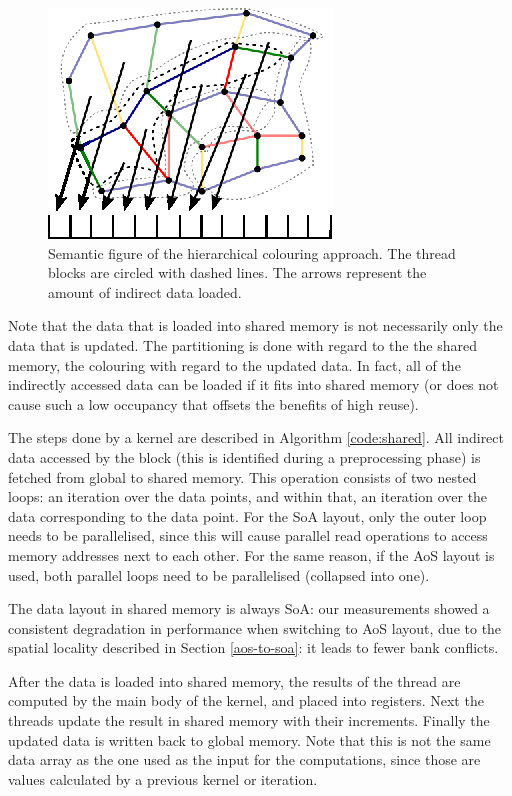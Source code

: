 \begin{figure}[Htpb]
  \centering
  \includegraphics{fig/svg/unstructured_hier.eps}
  \caption{Semantic figure of the hierarchical colouring approach. The thread
  blocks are circled with dashed lines. The arrows represent the amount of
  indirect data loaded.}
  \label{fig:unstructured_hier}
\end{figure}

Note that the data that is loaded into shared memory is not necessarily only the
data that is updated. The partitioning is done with regard to the the shared
memory, the colouring with regard to the updated data. In fact, all of the
indirectly accessed data can be loaded if it fits into shared memory (or does
not cause such a low occupancy that offsets the benefits of high reuse).

The steps done by a kernel are described in Algorithm \ref{code:shared}. All
indirect data accessed by the block (this is identified during a preprocessing
phase) is fetched from global to shared memory. This operation consists of two
nested loops: an iteration over the data points, and within that, an iteration
over the data corresponding to the data point. For the SoA layout, only the
outer loop needs to be parallelised, since this will cause parallel read
operations to access memory addresses next to each other. For the same reason,
if the AoS layout is used, both parallel loops need to be parallelised
(collapsed into one).

The data layout in shared memory is always SoA: our measurements showed a
consistent degradation in performance when switching to AoS layout, due to the
spatial locality described in Section \ref{aos-to-soa}: it leads to fewer bank
conflicts.

After the data is loaded into shared memory, the results of the thread are
computed by the main body of the kernel, and placed into registers.  Next the
threads update the result in shared memory with their increments. Finally the
updated data is written back to global memory. Note that this is not the same
data array as the one used as the input for the computations, since those are
values calculated by a previous kernel or iteration.


